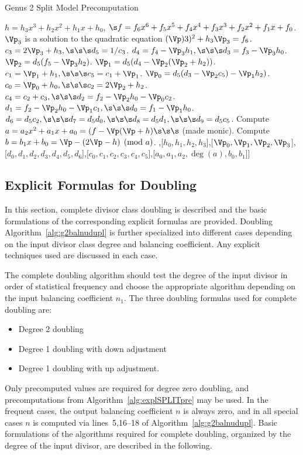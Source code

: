 \begin{algorithm}[htbp]
\caption{Genus 2 Split Model Precomputation\label{alg:explSPLITpre}}
\begin{algorithmic} [1]
\Require $h = h_3x^3 + h_2x^2 + h_1x + h_0$, $\s f = f_6x^6 + f_5x^5 + f_4x^4 + f_3x^3 + f_2x^2 + f_1x + f_0$.
\algrule
\State $\Vp_3$ is a solution to the quadratic equation $(\Vp)3)^2  + h_3\Vp_3 = f_6$.
\State $c_3 = 2\Vp_3 + h_3, \s\s\s d_5 = 1/c_3$.
\State $d_4 = f_4 - \Vp_3h_1, \s\s\s d_3 = f_3 - \Vp_3h_0$.
\State $\Vp_2 =  d_5(f_5 - \Vp_3h_2)$.
\State $\Vp_1 =  d_5(d_4- \Vp_2(\Vp_2 + h_2))$.
\State $c_1 = \Vp_1 + h_1, \s\s\s c_5 = c_1 + \Vp_1$.
\State $\Vp_0 =  d_5(d_3 - \Vp_2c_5) - \Vp_1h_2)$.
\State $c_0 = \Vp_0 + h_0, \s\s\s c_2 = 2\Vp_2 + h_2$.
\State $c_4 = c_2 + c_3, \s\s\s d_2 = f_2 - \Vp_2h_0 - \Vp_0c_2$.
\State $d_1 = f_2 - \Vp_2h_0 - \Vp_1c_1, \s\s\s d_0 = f_1 - \Vp_1h_0$.
\State $d_6 = d_5c_2, \s\s\s d_7 = d_5d_0, \s\s\s d_8 = d_5d_1, \s\s\s d_9 = d_5c_5$.
\State Compute $a = a_2x^2 + a_1x + a_0 = (f - \Vp(\Vp +  h) \s\s\s$ (made monic).
\State Compute $b = b_1x + b_0 = \Vp - (2\Vp - h) \pmod{a}$.
\State \Return [[$f_0,f_1,f_2,f_3,f_4,f_5,f_6$],[$h_0,h_1,h_2,h_3$],[$\Vp_0,\Vp_1,\Vp_2,\Vp_3$],
\Statex \hspace{37pt} [$d_0,d_1,d_2,d_3,d_4,d_5,d_6$],[$c_0,c_1,c_2,c_3,c_4,c_5$],[$a_0,a_1,a_2,\deg(a),b_0,b_1$]]
\end{algorithmic}
\end{algorithm}


\subsection{Explicit Formulas for Doubling}\label{sec:g2SPLITDBL}
In this section, complete divisor class doubling is described and the basic
formulations of the corresponding explicit formulas are provided. Doubling
Algorithm~\ref{alg:g2balnudupl} is further specialized into different cases
depending on the input divisor class degree and balancing coefficient. Any
explicit techniques used are discussed in each case. 

The complete doubling algorithm should test the degree of the input divisor in
order of statistical frequency and choose the appropriate algorithm depending on
the input balancing coefficient $n_1$. The three doubling formulas used for complete doubling are:
\begin{itemize}
    \item Degree 2 doubling
    \item Degree 1 doubling with down adjustment
    \item Degree 1 doubling with up adjustment. 
\end{itemize}  
Only precomputed values are required for degree zero doubling, and
precomputations from Algorithm~\ref{alg:explSPLITpre} may be used. In the
frequent cases, the output balancing coefficient $n$ is always zero, and in all
special cases $n$ is computed via lines~5,16--18 of
Algorithm~\ref{alg:g2balnudupl}. Basic formulations of the algorithms required
for complete doubling, organized by the degree of the input divisor, are
described in the following.

